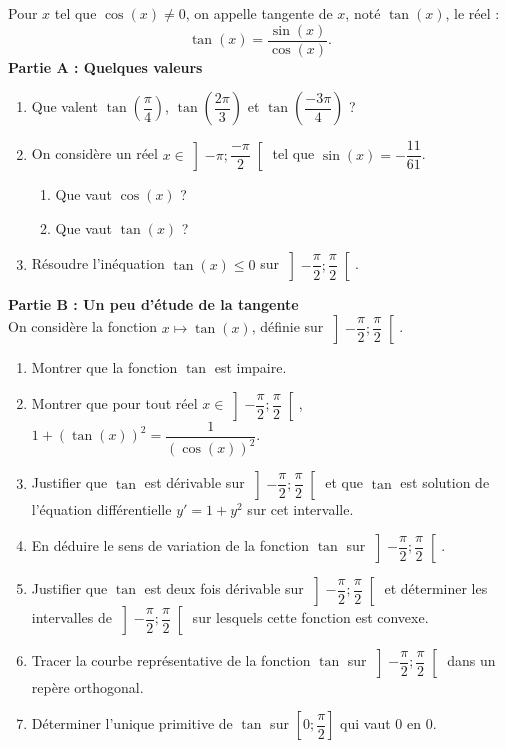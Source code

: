 \documentclass[11pt,fleqn, openany]{book} %
\begin{document}
\begin{exercise}[topic=trig03, subtitle={(Fonction tangente)}]Pour $x$ tel que $\cos(x)\neq 0$, on appelle tangente de $x$, noté $\tan (x)$, le réel :
\[ \tan (x) = \dfrac{\sin (x)}{\cos (x)}.\]
\textbf{Partie A : Quelques valeurs}
\begin{enumerate}
\item Que valent $\tan \left( \dfrac{\pi}{4} \right)$, $\tan \left( \dfrac{2\pi}{3} \right)$ et $\tan \left( \dfrac{-3\pi}{4} \right)$ ?
\item On considère un réel $x \in \left] -\pi ; \dfrac{-\pi}{2} \right[$ tel que $\sin (x) = -\dfrac{11}{61}$.
\begin{enumerate}
\item Que vaut $\cos (x)$ ?
\item Que vaut $\tan (x)$ ?
\end{enumerate}
\item Résoudre l'inéquation $\tan(x) \leqslant 0$ sur $\left]-\dfrac{\pi}{2};\dfrac{\pi}{2}\right[$.
\end{enumerate}
\textbf{Partie B : Un peu d'étude de la tangente}\\
On considère la fonction $x\mapsto \tan (x)$, définie sur $\left]-\dfrac{\pi}{2};\dfrac{\pi}{2}\right[$.
\begin{enumerate}
\item Montrer que la fonction $\tan$ est impaire.
\item Montrer que pour tout réel $x\in\left]-\dfrac{\pi}{2};\dfrac{\pi}{2}\right[$, $1+(\tan(x))^2=\dfrac{1}{(\cos(x))^2}$.
\item Justifier que $\tan$ est dérivable sur $\left]-\dfrac{\pi}{2};\dfrac{\pi}{2}\right[$ et que $\tan$ est solution de l'équation différentielle $y'=1+y^2$ sur cet intervalle.
\item En déduire le sens de variation de la fonction $\tan$ sur $\left]-\dfrac{\pi}{2};\dfrac{\pi}{2}\right[$.
\item Justifier que $\tan$ est deux fois dérivable sur $\left]-\dfrac{\pi}{2};\dfrac{\pi}{2}\right[$ et déterminer les intervalles de $\left]-\dfrac{\pi}{2};\dfrac{\pi}{2}\right[$ sur lesquels cette fonction est convexe.
\item Tracer la courbe représentative de la fonction $\tan$ sur $\left]-\dfrac{\pi}{2};\dfrac{\pi}{2}\right[$ dans un repère orthogonal.
\item Déterminer l'unique primitive de $\tan$ sur $\left[0;\dfrac{\pi}{2}\right]$ qui vaut 0 en 0.
\end{enumerate}
\end{exercise}
\end{document}
